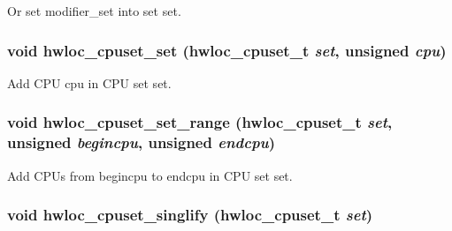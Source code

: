 Or set {\ttfamily modifier\_\-set} into set {\ttfamily set}. \hypertarget{group__hwlocality__cpuset_gac5ba8c6d6367436995f67dbd4b3ba1de}{
\subsubsection[{hwloc\_\-cpuset\_\-set}]{\setlength{\rightskip}{0pt plus 5cm}void hwloc\_\-cpuset\_\-set ({\bf hwloc\_\-cpuset\_\-t} {\em set}, \/  unsigned {\em cpu})}}
\label{group__hwlocality__cpuset_gac5ba8c6d6367436995f67dbd4b3ba1de}


Add CPU {\ttfamily cpu} in CPU set {\ttfamily set}. \hypertarget{group__hwlocality__cpuset_ga9bcf94a6a5c877071116ff2f4a395956}{
\subsubsection[{hwloc\_\-cpuset\_\-set\_\-range}]{\setlength{\rightskip}{0pt plus 5cm}void hwloc\_\-cpuset\_\-set\_\-range ({\bf hwloc\_\-cpuset\_\-t} {\em set}, \/  unsigned {\em begincpu}, \/  unsigned {\em endcpu})}}
\label{group__hwlocality__cpuset_ga9bcf94a6a5c877071116ff2f4a395956}


Add CPUs from {\ttfamily begincpu} to {\ttfamily endcpu} in CPU set {\ttfamily set}. \hypertarget{group__hwlocality__cpuset_ga548a6620cce008fc5b1e2110d25135fe}{
\subsubsection[{hwloc\_\-cpuset\_\-singlify}]{\setlength{\rightskip}{0pt plus 5cm}void hwloc\_\-cpuset\_\-singlify ({\bf hwloc\_\-cpuset\_\-t} {\em set})}}
\label{group__hwlocality__cpuset_ga548a6620cce008fc5b1e2110d25135fe}


